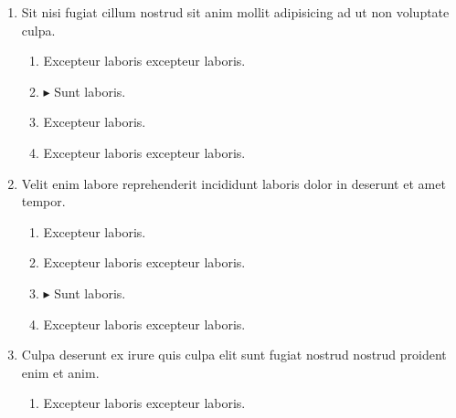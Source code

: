 \documentclass[a4paper,12pt]{article}
\begin{document}
\begin{enumerate}[label=\textbf{\arabic*.}]
\begin{multicols}{2}
\begin{enumerate}
		\item  Excepteur laboris excepteur laboris.
  
		\item $\blacktriangleright$  Sunt laboris.
    
		\item  Excepteur laboris.
    
	\end{enumerate}

\end{multicols}
\item Sit nisi fugiat cillum nostrud sit anim mollit adipisicing ad ut non voluptate culpa.
\begin{multicols}{2}
	\begin{enumerate}
		\item  Excepteur laboris excepteur laboris.
    
		\item $\blacktriangleright$  Sunt laboris.
    
		\item  Excepteur laboris.
    
		\item  Excepteur laboris excepteur laboris.
  
	\end{enumerate}

\end{multicols}
\item Velit enim labore reprehenderit incididunt laboris dolor in deserunt et amet tempor.
\begin{multicols}{2}
	\begin{enumerate}
		\item  Excepteur laboris.
    
		\item  Excepteur laboris excepteur laboris.
  
		\item $\blacktriangleright$  Sunt laboris.
    
		\item  Excepteur laboris excepteur laboris.
    
	\end{enumerate}

\end{multicols}
\item Culpa deserunt ex irure quis culpa elit sunt fugiat nostrud nostrud proident enim et anim.
\begin{multicols}{2}
	\begin{enumerate}
		\item  Excepteur laboris excepteur laboris.
  

\end{enumerate}
\end{multicols}
\end{enumerate}
\end{document}
